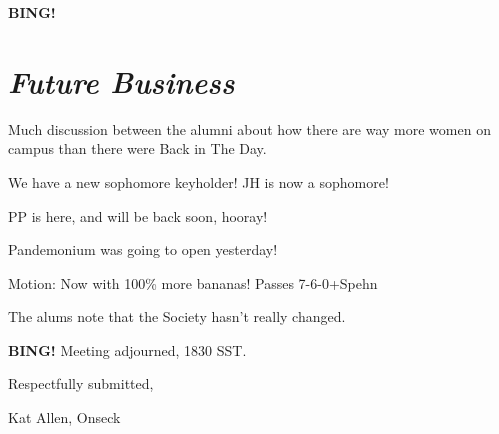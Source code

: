 \documentclass[10pt]{article}
\newcommand{\bing}{{\bf BING!} }
\newcommand{\goto}[1]{\bing \vskip 12pt \section*{{\em{#1}}}}
\begin{document}
\goto{Future Business}
Much discussion between the alumni about how there are way more women
on campus than there were Back in The Day.

We have a new sophomore keyholder! JH is now a sophomore! 

PP is here, and will be back soon, hooray!

Pandemonium was going to open yesterday!

Motion: Now with 100\% more bananas!  Passes 7-6-0+Spehn

The alums note that the Society hasn't really changed.

\bing
\noindent
Meeting adjourned, 1830 SST.

\vspace{18pt}

\centerline{Respectfully submitted,}
\centerline{Kat Allen, Onseck}
\end{document}
